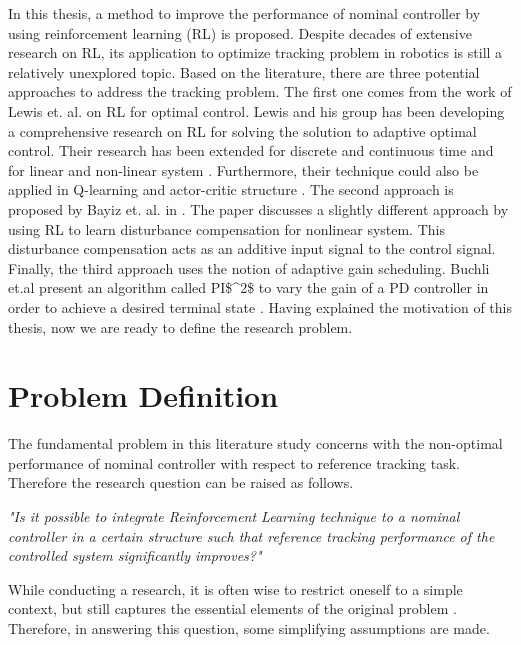 In this thesis, a method to improve the performance of nominal controller by using reinforcement learning (\ac{RL}) is proposed. Despite decades of extensive research on \ac{RL}, its application to optimize tracking problem in robotics is still a relatively unexplored topic. Based on the literature, there are three potential approaches to address the tracking problem. The first one comes from the work of Lewis et. al. on \ac{RL} for optimal control. Lewis and his group has been developing a comprehensive research on \ac{RL} for solving the solution to adaptive optimal control. Their research has been extended for discrete and continuous time and for linear and non-linear system \cite{Kiumarsi6760476} \cite{Lewis5227780} \cite{Modares20141780} \cite{Modares6760477}. Furthermore, their technique could also be applied in Q-learning \cite{Kiumarsi20141167} and actor-critic structure \cite{Kiumarsi6918527}. The second approach is proposed by Bayiz et. al. in \cite{Efe2014}. The paper discusses a slightly different approach by using \ac{RL} to learn disturbance compensation for nonlinear system. This disturbance compensation acts as an additive input signal to the control signal. Finally, the third approach uses the notion of adaptive gain scheduling. Buchli et.al present an algorithm called \ac{PI$^2$} to vary the gain of a \ac{PD} controller in order to achieve a desired terminal state \cite{Buchli2010} \cite{Buchli6037312}. Having explained the motivation of this thesis, now we are ready to define the research problem.



\section{Problem Definition}
The fundamental problem in this literature study concerns with the non-optimal performance of nominal controller with respect to reference tracking task. Therefore the research question can be raised as follows.

\textit{"Is it possible to integrate Reinforcement Learning technique to a nominal controller in a certain structure such that reference tracking performance of the controlled system significantly improves?"}

While conducting a research, it is often wise to restrict oneself to a simple context, but still captures the essential elements of the original problem \cite{einstein}. Therefore, in answering this question, some simplifying assumptions are made.


